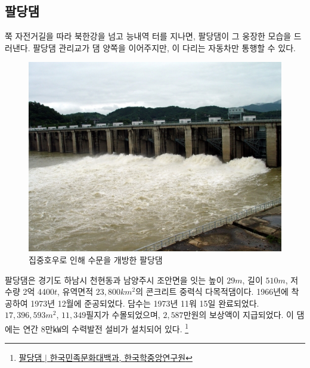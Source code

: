 \documentclass[chapter, oneside]{oblivoir}
\begin{document}
\subsection{팔당댐}
쭉 자전거길을 따라 북한강을 넘고 능내역 터를 지나면, 팔당댐이 그 웅장한 모습을 드러낸다. 
팔당댐 관리교가 댐 양쪽을 이어주지만, 이 다리는 자동차만 통행할 수 있다.

\begin{figure}
    \centering
    \includegraphics[width=.8\textwidth]{img/팔당댐.jpg}
    \caption{집중호우로 인해 수문을 개방한 팔당댐 \protect\footnotemark}
    \label{fig:my_labe9}
\end{figure}


팔당댐은 경기도 하남시 천현동과 남양주시 조안면을 잇는
높이 $29m$, 길이 $510m$, 저수량 2억 4400$t$, 유역면적 $23,800km^2$의 콘크리트 중력식 다목적댐이다.
1966년에 착공하여 1973년 12월에 준공되었다.
담수는 1973년 11워 15일 완료되었다.
$17,396,593 m^2$, $11,349$필지가 수몰되었으며, $2,587$만원의 보상액이 지급되었다.
이 댐에는 연간 8만㎾의 수력발전 설비가 설치되어 있다.
\footnote{\label{paldang}\href{https://terms.naver.com/entry.naver?docId=531161&cid=46631&categoryId=46631}{팔당댐 $|$ 한국민족문화대백과, 한국학중앙연구원}}
\end{document}
